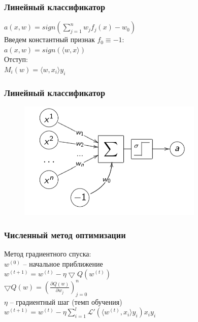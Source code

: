 \documentclass[12pt]{beamer}
\begin{document}
\begin{frame}\frametitle{Линейный классификатор}
$a(x, w) = sign(\sum_{j=1}^n w_jf_j(x) - w_0)$\\
\vspace{3mm}
Введем константный признак $f_0 \equiv -1$:\\
\vspace{3mm}
$a(x, w) = sign(\langle w, x\rangle)$\\
\vspace{3mm}
Отступ:\\
$M_i(w) = \langle w, x_i\rangle y_i$
\end{frame}


\begin{frame}\frametitle{Линейный классификатор}
\begin{figure}[htbp]
  \includegraphics[height=160pt, keepaspectratio = true]{images/neuron}   
\end{figure}
\end{frame}

\begin{frame}\frametitle{Численный метод оптимизации}
Метод градиентного спуска:\\\vspace{3mm}
$w^{(0)} $ -- начальное приближение\\
\vspace{3mm}
$w^{(t+1)} =  w^{(t)} - \eta \bigtriangledown Q(w^{(t)})$\\
\vspace{3mm}
$\bigtriangledown Q(w) = (\frac{\partial Q(w)}{\partial w_j})_{j=0}^n$\\
\vspace{3mm}
$\eta$ -- градиентный шаг (темп обучения)\\
\vspace{3mm}
$w^{(t+1)} =  w^{(t)} - \eta \sum_{i=1}^l \mathcal{L}'(\langle w^{(t)}, x_i\rangle y_i)x_iy_i$\\
\end{frame}
\end{document}
